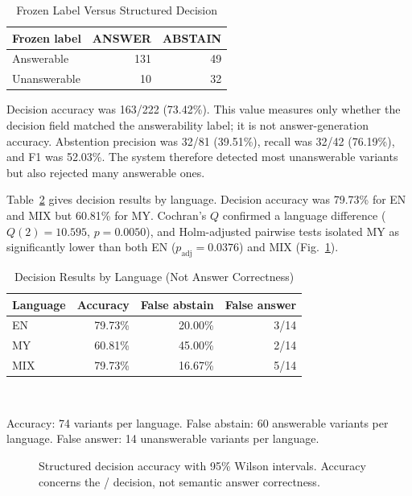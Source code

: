\documentclass[a4paper,conference]{IEEEtran}
\newcommand{\code}[1]{\texttt{\detokenize{#1}}}
\begin{document}
\begin{table}[t]
\caption{Frozen Label Versus Structured Decision}
\label{tab:confusion}
\centering
\footnotesize
\begin{tabular}{|l|r|r|}
\hline
Frozen label & ANSWER & ABSTAIN \\
\hline
Answerable   & 131 & 49 \\
\hline
Unanswerable & 10  & 32 \\
\hline
\end{tabular}
\end{table}

Decision accuracy was 163/222 (73.42\%). This value measures only whether the decision field matched the answerability label; it is not answer-generation accuracy. Abstention precision was 32/81 (39.51\%), recall was 32/42 (76.19\%), and F1 was 52.03\%. The system therefore detected most unanswerable variants but also rejected many answerable ones.

Table~\ref{tab:decision} gives decision results by language. Decision accuracy was 79.73\% for EN and MIX but 60.81\% for MY. Cochran's $Q$ confirmed a language difference ($Q(2)=10.595$, $p=0.0050$), and Holm-adjusted pairwise tests isolated MY as significantly lower than both EN ($p_{\mathrm{adj}}=0.0376$) and MIX (Fig.~\ref{fig:decision-accuracy}).

\begin{table}[t]
\caption{Decision Results by Language (Not Answer Correctness)}
\label{tab:decision}
\centering
\footnotesize
\begin{tabular}{|l|r|r|r|}
\hline
Language & Accuracy & False abstain & False answer \\
\hline
EN  & 79.73\% & 20.00\% & 3/14 \\
\hline
MY  & 60.81\% & 45.00\% & 2/14 \\
\hline
MIX & 79.73\% & 16.67\% & 5/14 \\
\hline
\end{tabular}
\\[2pt]
\parbox{0.92\columnwidth}{\scriptsize Accuracy: 74 variants per language. False abstain: 60 answerable variants per language. False answer: 14 unanswerable variants per language.}
\end{table}

\begin{figure}[t]
\centering

\caption{Structured decision accuracy with 95\% Wilson intervals. Accuracy concerns the \code{ANSWER}/\code{ABSTAIN} decision, not semantic answer correctness.}
\label{fig:decision-accuracy}
\end{figure}
\end{document}
